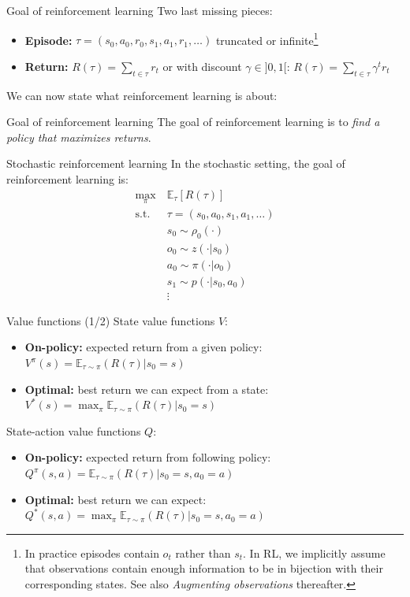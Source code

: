 \documentclass[10pt, aspectratio=1610]{beamer}
\begin{document}
\begin{frame}{Goal of reinforcement learning}
    Two last missing pieces:
    \begin{itemize}
        \item \textbf{Episode:} $\tau = (s_0, a_0, r_0, s_1, a_1, r_1, \ldots)$ truncated or infinite\footnote{In practice episodes contain $o_t$ rather than $s_t$. In RL, we implicitly assume that observations contain enough information to be in bijection with their corresponding states. See also \emph{Augmenting observations} thereafter.}
        \item \textbf{Return:} $R(\tau) = \sum_{t \in \tau} r_t$ or with discount $\gamma \in ]0, 1[$: $R(\tau) = \sum_{t \in \tau} \gamma^t r_t$
    \end{itemize}
    We can now state what reinforcement learning is about:

    \vspace{1ex}
    \begin{block}{Goal of reinforcement learning}
        The goal of reinforcement learning is to \emph{find a policy that maximizes returns}.
    \end{block}
\end{frame}

\begin{frame}{Stochastic reinforcement learning}
    In the stochastic setting, the goal of reinforcement learning is:
    \begin{align*}
        \max_{\pi} \ & \mathbb{E}_{\tau} [R(\tau)] \\
        \mathrm{s.t.} \ & \tau = (s_0, a_0, s_1, a_1, \ldots) \\
        & s_0 \sim \rho_0(\cdot) \\
        & o_0 \sim z(\cdot | s_0) \\
        & a_0 \sim \pi(\cdot | o_0) \\
        & s_1 \sim p(\cdot | s_0, a_0) \\
        & \vdots
    \end{align*}
\end{frame}

\begin{frame}{Value functions (1/2)}
    State value functions $V$:
    \begin{itemize}
        \item \textbf{On-policy:} expected return from a given policy: $V^\pi(s) = \mathbb{E}_{\tau \sim \pi}(R(\tau) | s_0 = s)$
        \item \textbf{Optimal:} best return we can expect from a state: $V^*(s) = \max_\pi \mathbb{E}_{\tau \sim \pi}(R(\tau) | s_0 = s)$
    \end{itemize}
    State-action value functions $Q$:
    \begin{itemize}
        \item \textbf{On-policy:} expected return from following policy: $Q^\pi(s, a) = \mathbb{E}_{\tau \sim \pi}(R(\tau) | s_0 = s, a_0 = a)$
        \item \textbf{Optimal:} best return we can expect: $Q^*(s, a) = \max_\pi \mathbb{E}_{\tau \sim \pi}(R(\tau) | s_0 = s, a_0 = a)$
    \end{itemize}
\end{frame}
\end{document}
